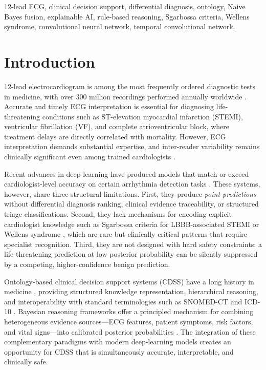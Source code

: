 \documentclass[journal]{IEEEtran}
\begin{document}
\begin{IEEEkeywords}
12-lead ECG, clinical decision support, differential diagnosis,
ontology, Naive Bayes fusion, explainable AI, rule-based reasoning,
Sgarbossa criteria, Wellens syndrome, convolutional neural network,
temporal convolutional network.
\end{IEEEkeywords}

\section{Introduction}
\label{sec:intro}

 12-lead electrocardiogram is among the most
frequently ordered diagnostic tests in medicine, with over
300 million recordings performed annually worldwide
\cite{hannun2019cardiologist}.
Accurate and timely ECG interpretation is essential for diagnosing
life-threatening conditions such as ST-elevation myocardial infarction
(STEMI), ventricular fibrillation (VF), and complete atrioventricular
block, where treatment delays are directly correlated with mortality.
However, ECG interpretation demands substantial expertise, and
inter-reader variability remains clinically significant even among
trained cardiologists \cite{ribeiro2020automatic}.

Recent advances in deep learning have produced models that match or
exceed cardiologist-level accuracy on certain arrhythmia detection
tasks \cite{hannun2019cardiologist,ribeiro2020automatic,
strodthoff2020deep}.
These systems, however, share three structural limitations.
First, they produce \emph{point predictions} without differential
diagnosis ranking, clinical evidence traceability, or structured
triage classifications.
Second, they lack mechanisms for encoding explicit cardiologist
knowledge such as Sgarbossa criteria for LBBB-associated STEMI
\cite{sgarbossa1996electrocardiographic} or Wellens syndrome
\cite{zwaan1989wellens}, which are rare but clinically critical
patterns that require specialist recognition.
Third, they are not designed with hard safety constraints: a
life-threatening prediction at low posterior probability can be
silently suppressed by a competing, higher-confidence benign
prediction.

Ontology-based clinical decision support systems (CDSS) have a long
history in medicine \cite{shortliffe2001biomedical}, providing
structured knowledge representation, hierarchical reasoning, and
interoperability with standard terminologies such as SNOMED-CT
\cite{snomedct} and ICD-10 \cite{icd10}.
Bayesian reasoning frameworks offer a principled mechanism for
combining heterogeneous evidence sources—ECG features, patient
symptoms, risk factors, and vital signs—into calibrated posterior
probabilities \cite{spiegelhalter1986probabilistic}.
The integration of these complementary paradigms with modern
deep-learning models creates an opportunity for CDSS that is
simultaneously accurate, interpretable, and clinically safe.
\end{document}
